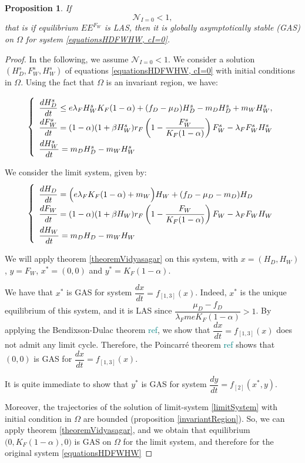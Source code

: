 \documentclass{article}
\newcommand{\lfw}{\lambda_{F}}
\newcommand{\lfw}{\lambda_{F}}
\newcommand{\marc}[1]{\textcolor{teal}{#1}}
\newtheorem{prop}{Proposition}
\begin{document}
\begin{prop}\label{propEEFGAS}If 
$$
\mathcal{N}_{I =0} < 1,
$$
that is if equilibrium $EE^{F_W}$ is LAS, then it is globally asymptotically stable (GAS) on $\Omega$ for system \eqref{equationsHDFWHW, cI=0}.
\end{prop}

\begin{proof}
In the following, we assume $ \mathcal{N}_{I =0} < 1$. We consider a solution $(H_D^s, F_W^s, H_W^s)$ of equations \eqref{equationsHDFWHW, cI=0} with initial conditions in $\Omega$. Using the fact that $\Omega$ is an invariant region, we have:

\begin{equation}
\def\arraystretch{2}
\left\{ \begin{array}{l}
\dfrac{dH^s_D}{dt} \leq e\lfw H^s_W K_F(1-\alpha) + (f_D - \mu_D) H^s_D - m_D H^s_D + m_W H^s_W , \\
\dfrac{dF^s_W}{dt} = (1-\alpha)(1 + \beta H_W^s) r_F \left(1 - \dfrac{F^s_W}{K_F(1-\alpha)} \right) F^s_W - \lfw F^s_W H^s_W \\
\dfrac{dH^s_W}{dt}= m_D H^s_D - m_W H^s_W 
\end{array} \right.
\end{equation}

We consider the limit system, given by:
\begin{equation}
\def\arraystretch{2}
\left\{ \begin{array}{l}
\dfrac{dH_D}{dt} = \Big(e\lfw K_F(1-\alpha) + m_W\Big)H_W + (f_D - \mu_D - m_D) H_D \\
\dfrac{dF_W}{dt} =(1-\alpha)(1 + \beta H_W) r_F \left(1 - \dfrac{F_W}{K_F(1-\alpha)} \right) F_W - \lfw F_W H_W \\
\dfrac{dH_W}{dt}= m_D H_D - m_W H_W 
\end{array} \right.
\label{limitSystem}
\end{equation}

We will apply theorem \ref{theoremVidyasagar} on this system, with $x = (H_D, H_W)$, $y = F_W$, $x^* = (0,0)$ and $y^* = K_F(1- \alpha)$.

We have that $x^*$ is GAS for system $\dfrac{dx}{dt} = f_{[1,3]}(x)$. Indeed, $x^*$ is the unique equilibrium of this system, and it is LAS since $\dfrac{\mu_D - f_D}{\lfw m e K_F(1-\alpha)} >1$. By applying the Bendixson-Dulac theorem \marc{ref}, we show that $\dfrac{dx}{dt} = f_{[1,3]}(x)$ does not admit any limit cycle. Therefore, the Poincarré theorem \marc{ref} shows that $(0, 0)$ is GAS for $\dfrac{dx}{dt} = f_{[1,3]}(x)$.

It is quite immediate to show that $y^*$ is GAS for system $\dfrac{dy}{dt} = f_{[2]}(x^*, y)$. 

Moreover, the trajectories of the solution of limit-system \eqref{limitSystem} with initial condition in $\Omega$ are bounded (proposition \ref{invariantRegion}). So, we can apply theorem \ref{theoremVidyasagar}, and we obtain that equilibrium $\Big(0, K_F(1-\alpha), 0 \Big)$ is GAS on $\Omega$ for the limit system, and therefore for the original system \eqref{equationsHDFWHW}


\end{proof}
\end{document}
